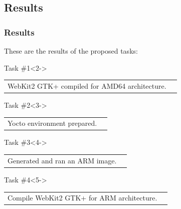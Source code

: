 \documentclass[slidestop,compress,mathserif]{beamer}
\newcommand{\cmark}{\ding{51}}
\newcommand{\xmark}{\ding{55}}
\begin{document}
\subsection{Results}
\begin{frame}
  \frametitle{Results}

  These are the results of the proposed tasks:

  \begin{block}{Task \#1}<2->
    \begin{tabularx}{\textwidth}{Xr}
      WebKit2 GTK+ compiled for AMD64 architecture. & \cmark \\
    \end{tabularx}
  \end{block}

  \begin{block}{Task \#2}<3->
    \begin{tabularx}{\textwidth}{Xr}
      Yocto environment prepared. & \cmark \\
    \end{tabularx}
  \end{block}

  \begin{block}{Task \#3}<4->
    \begin{tabularx}{\textwidth}{Xr}
      Generated and ran an ARM image. & \cmark \\
    \end{tabularx}
  \end{block}

  \begin{alertblock}{Task \#4}<5->
    \begin{tabularx}{\textwidth}{Xr}
      Compile WebKit2 GTK+ for ARM architecture. & \xmark \\
    \end{tabularx}
  \end{alertblock}
\end{frame}
\end{document}
